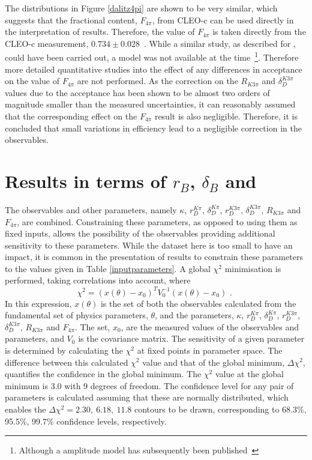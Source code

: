 The distributions in Figure \ref{dalitz4pi} are shown to be very similar, which suggests that the fractional \CP content, $F_{4\pi}$, from CLEO-c can be used directly in the interpretation of \lhcb results. Therefore, the value of $F_{4\pi}$ is taken directly from the CLEO-c measurement, $0.734 \pm 0.028$~\cite{charm4pi}. While a similar study, as described for \decay{\Dz}{\Km\pip\pim\pip}, could have been carried out, a model was not available at the time~\footnote{Although a \decay{\Dz}{\pim\pip\pim\pip} amplitude model has subsequently been published~\cite{4piamplitude}}. Therefore more detailed quantitative studies into the effect of any differences in acceptance on the value of $F_{4\pi}$ are not performed. As the correction on the $R_{K3\pi}$ and $\delta_D^{K3\pi}$ values due to the \lhcb acceptance has been shown to be almost two orders of magnitude smaller than the measured uncertainties, it can reasonably assumed that the corresponding effect on the $F_{4\pi}$ result is also negligible. Therefore, it is concluded that small variations in efficiency lead to a negligible correction in the observables. 


\section{Results in terms of $r_B$, $\delta_B$ and \Pgamma}
\label{sec:interpretation:gammadini}

The \CP observables and other parameters, namely $\kappa$, $r_D^{K\pi}$, $\delta_D^{K\pi}$, $r_D^{K3\pi}$, $\delta_D^{K3\pi}$, $R_{K3\pi}$ and $F_{4\pi}$, are combined. Constraining these parameters, as opposed to using them as fixed inputs, allows the possibility of the \CP observables providing additional sensitivity to these parameters. While the dataset here is too small to have an impact, it is common in the presentation of \lhcb results to constrain these parameters to the values given in Table \ref{inputparameters}. A global $\chi^2$ minimisation is performed, taking correlations into account, where
\begin{equation}
\chi^2 = (x(\theta) - x_0)^TV_0^{-1}(x(\theta)-x_0) \text{ . }
\end{equation}
In this expression, $x(\theta)$ is the set of both the observables calculated from the fundamental set of physics parameters, $\theta$, and the parameters, $\kappa$, $r_D^{K\pi}$, $\delta_D^{K\pi}$, $r_D^{K3\pi}$, $\delta_D^{K3\pi}$, $R_{K3\pi}$ and $F_{4\pi}$. The set, $x_0$, are the measured values of the observables and parameters, and $V_0$ is the covariance matrix. The sensitivity of a given parameter is determined by calculating the $\chi^2$ at fixed points in parameter space. The difference between this calculated $\chi^2$ value and that of the global minimum, $\Delta\chi^2$, quantifies the confidence in the global minimum. The $\chi^2$ value at the global minimum is 3.0 with 9 degrees of freedom. The confidence level for any pair of parameters is calculated assuming that these are normally distributed, which enables the $\Delta \chi^2 = 2.30,\ 6.18,\ 11.8$ contours to be drawn, corresponding to 68.3\%, 95.5\%, 99.7\% confidence levels, respectively. 

